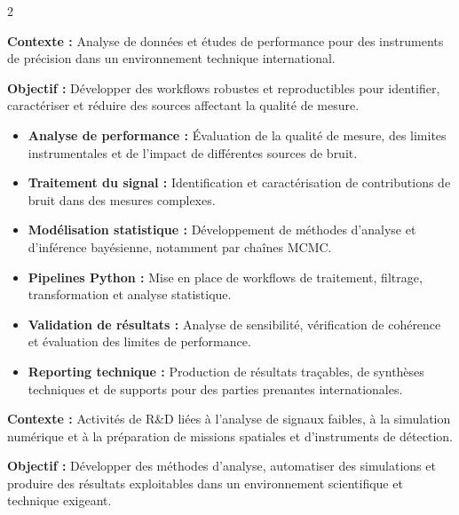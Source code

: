\documentclass[8pt,a4paper,ragged2e,withhyper]{altacv}
\begin{document}
\begin{paracol}{2}
\divider


\textbf{Contexte :} Analyse de données et études de performance pour des instruments de précision dans un environnement technique international.

\textbf{Objectif :} Développer des workflows robustes et reproductibles pour identifier, caractériser et réduire des sources affectant la qualité de mesure.

\begin{itemize}
  \item \textbf{Analyse de performance :} Évaluation de la qualité de mesure, des limites instrumentales et de l’impact de différentes sources de bruit.
  \item \textbf{Traitement du signal :} Identification et caractérisation de contributions de bruit dans des mesures complexes.
  \item \textbf{Modélisation statistique :} Développement de méthodes d’analyse et d’inférence bayésienne, notamment par chaînes MCMC.
  \item \textbf{Pipelines Python :} Mise en place de workflows de traitement, filtrage, transformation et analyse statistique.
  \item \textbf{Validation de résultats :} Analyse de sensibilité, vérification de cohérence et évaluation des limites de performance.
  \item \textbf{Reporting technique :} Production de résultats traçables, de synthèses techniques et de supports pour des parties prenantes internationales.
\end{itemize}

\divider


\textbf{Contexte :} Activités de R\&D liées à l’analyse de signaux faibles, à la simulation numérique et à la préparation de missions spatiales et d’instruments de détection.

\textbf{Objectif :} Développer des méthodes d’analyse, automatiser des simulations et produire des résultats exploitables dans un environnement scientifique et technique exigeant.


\end{paracol}
\end{document}
